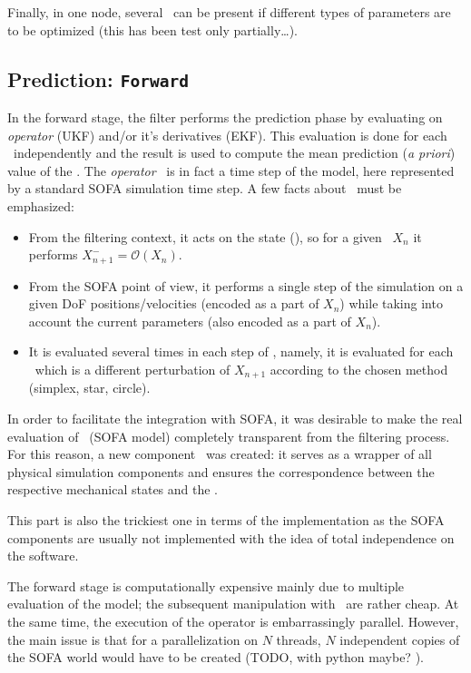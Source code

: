 \documentclass[10pt]{article}
\begin{document}
Finally, in one node, several  \opr\ can be present if different types of parameters are to be optimized (this has been test only partially\ldots).

\subsection{Prediction: \texttt{Forward}}
In the forward stage, the filter performs the prediction phase by evaluating on \emph{operator} (UKF) and/or it's derivatives (EKF). This evaluation
is done for each \smp\ independently and the 
result is used to compute the mean prediction (\emph{a priori}) value of the \sstate. The \emph{operator} \op\ is in fact a time step of the model,
here represented by a standard SOFA simulation time step.
A few facts about \op\ must be emphasized:
\begin{itemize}
\item From the filtering context, it acts on the state (\sstate), so for a given \sstate\ $X_n$ it performs $X^-_{n+1} =
\mathcal{O}(X_{n})$.  
\item From the SOFA point of view, it performs a single step of the simulation on a given DoF positions/velocities (encoded as a part of $X_n$)  while
taking into account the current parameters (also encoded as a part of $X_n$).
\item It is evaluated several times in each step of \ssda, namely, it is evaluated for each \smp\ which is a different perturbation of $X_{n+1}$
according to the chosen method (simplex, star, circle). 
\end{itemize}

In order to facilitate the integration with SOFA, it was desirable to make the real evaluation of \op\ (SOFA model) completely transparent
from the filtering process. 
For this reason, a new component \ssw\  was created: it serves as a wrapper of all physical simulation components and ensures the correspondence between the respective mechanical states and the \sstate.

This part is also the trickiest one in terms of the implementation as the SOFA components are usually not implemented with the idea of total independence on the software.

The forward stage is computationally  expensive mainly due to multiple evaluation of the model; the subsequent manipulation with \sstate\ are rather cheap. At the same time, the execution of the operator is embarrassingly parallel. However, the main issue is that for a parallelization on $N$ threads, $N$ independent copies of the SOFA world would have to be created (TODO, with python maybe? ).
\end{document}
